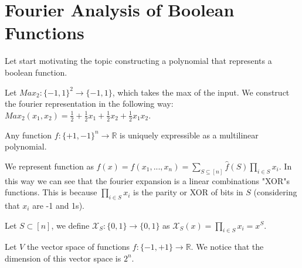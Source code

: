 \section{Fourier Analysis of Boolean Functions}

Let start motivating the topic constructing a polynomial that represents a boolean function.

\begin{example}
    Let $Max_2:\{-1,1\}^2 \rightarrow \{-1,1\}$, which takes the max of the input. 
    We construct the fourier representation in the following way:
    $Max_2(x_1,x_2) = \frac{1}{2} + \frac{1}{2} x_1 + \frac{1}{2} x_2 + \frac{1}{2} x_1x_2.$
\end{example}

\begin{theorem}
    Any function $f:\{+1,-1\}^{n} \rightarrow \mathbb{R}$ is uniquely expressible as a multilinear polynomial.
\end{theorem}

We represent function as $f(x) = f(x_1,...,x_n)= \sum_{S \subseteq [n]} \hat{f}(S) \prod_{i \in S} x_i.$
In this way we can see that the fourier expansion is a linear combinations "XOR"s functions. This is 
because $\prod_{i \in S} x_i$ is the parity or XOR of bits in $S$ (considering that $x_i$ are -1 and 1s).

\begin{definition}
    Let $S \subset [n]$, we define $\mathcal{X}_S:\{0,1\} \rightarrow \{0,1\}$ as 
    $\mathcal{X}_S(x) = \prod_{i \in S}^{}x_i = x^{S}$.
\end{definition}

Let $V$ the vector space of functions $f:\{-1,+1\} \rightarrow \mathbb{R}$. We notice that
the dimension of this vector space is $2^n$.

